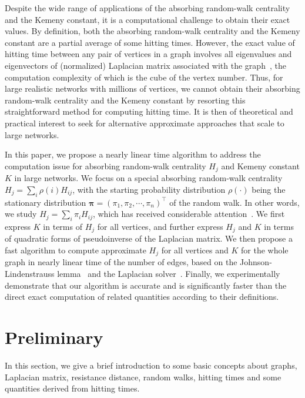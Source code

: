 \documentclass[sigconf]{acmart}
\newcommand\ppi{\boldsymbol{\pi}}
\begin{document}
Despite the wide range of applications of the absorbing random-walk centrality and the Kemeny constant, it is a computational challenge to obtain their exact values. By definition, both the absorbing random-walk centrality and the Kemeny constant are a partial average of some hitting times. However, the exact value of hitting time between any pair of vertices in a graph involves all eigenvalues and eigenvectors of (normalized) Laplacian matrix associated with the graph~\cite{Lo93,LiZh13PRE}, the computation complexity of which is the cube of the vertex number. Thus, for large realistic networks with millions of vertices, we cannot obtain their absorbing random-walk centrality and the Kemeny constant by resorting this straightforward method for computing hitting time.  It is then of theoretical and practical interest to seek for alternative approximate approaches that scale to large networks.

In this paper, we propose a nearly linear time algorithm to address the computation issue for absorbing random-walk centrality  $H_j$ and Kemeny constant $K$ in large networks. We focus on a special absorbing random-walk centrality $H_j=\sum_{i} \rho(i) H_{ij}$, with the starting probability distribution $\rho(\cdot)$ being the stationary distribution $\ppi=(\pi_1, \pi_2, \cdots, \pi_n)^{\top}$ of the random walk. In other words,  we study $H_j=\sum_{i} \pi_i H_{ij}$, which has received considerable attention~\cite{TeBeVo09,Be09,Be16}. We first  express $K$ in terms of $H_j$ for all vertices, and further  express $H_j$ and $K$ in terms of quadratic forms of pseudoinverse of the Laplacian matrix. We then propose a fast algorithm to compute approximate $H_j$ for all vertices and $K$ for the whole graph in nearly linear time of the number of edges, based on the Johnson-Lindenstrauss lemma~\cite{Ac01} and the Laplacian solver~\cite{SpTe04,Sp10,KoMiPe11,LiBr12,CoKyMiPaPeRaSu14,KySa16}. Finally, we experimentally demonstrate that our algorithm is accurate and is significantly faster than the direct exact computation of related quantities according to their definitions.

\section{Preliminary}

In this section, we give a brief introduction to some basic concepts about graphs, Laplacian matrix, resistance distance, random walks, hitting times and some quantities derived from hitting times. %
\end{document}
